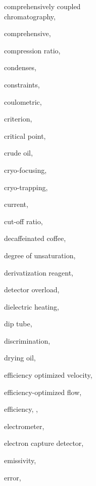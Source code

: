 \begin{theindex}
  \item \lowercase {comprehensively coupled \\ chromatography}, 
  \item \lowercase {comprehensive}, 
  \item \lowercase {compression ratio}, 
  \item \lowercase {condenses}, 
  \item \lowercase {constraints}, 
  \item \lowercase {coulometric}, 
  \item \lowercase {criterion}, 
  \item \lowercase {critical point}, 
  \item \lowercase {crude oil}, 
  \item \lowercase {cryo-focusing}, 
  \item \lowercase {cryo-trapping}, 
  \item \lowercase {current}, 
  \item \lowercase {cut-off ratio}, 
  \item \lowercase {decaffeinated coffee}, 
  \item \lowercase {degree of unsaturation}, 
  \item \lowercase {derivatization reagent}, 
  \item \lowercase {detector overload}, 
  \item \lowercase {dielectric heating}, 
  \item \lowercase {dip tube}, 
  \item \lowercase {discrimination}, 
  \item \lowercase {drying oil}, 
  \item \lowercase {efficiency optimized velocity}, 
  \item \lowercase {efficiency-optimized flow}, 
  \item \lowercase {efficiency}, , 
  \item \lowercase {electrometer}, 
  \item \lowercase {electron capture detector}, 
  \item \lowercase {emissivity}, 
  \item \lowercase {error}, 

\end{theindex}

